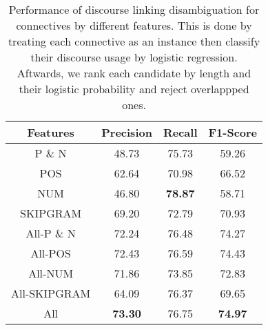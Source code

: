 \begin{table}[h]
\centering
\begin{tabular}{|c|c|c|c|}
\hline

\bf Features            & \bf Precision & \bf Recall & \bf F1-Score \\ \hline
    P \& N              &     48.73     &     75.73  &     59.26    \\ \hline
    POS                 &     62.64     &     70.98  &     66.52    \\ \hline
    NUM                 &     46.80     & \bf 78.87  &     58.71    \\ \hline
    SKIPGRAM            &     69.20     &     72.79  &     70.93    \\ \hline
    All-P \& N          &     72.24     &     76.48  &     74.27    \\ \hline
    All-POS             &     72.43     &     76.59  &     74.43    \\ \hline
    All-NUM             &     71.86     &     73.85  &     72.83    \\ \hline
    All-SKIPGRAM        &     64.09     &     76.37  &     69.65    \\ \hline
    All                 & \bf 73.30     &     76.75  & \bf 74.97    \\


\end{tabular}
\caption{\label{t:classify-features} Performance of discourse linking
disambiguation for connectives by different features. This is done by
treating each connective as an instance then classify their discourse usage
by logistic regression. Aftwards, we rank each candidate by length and their
logistic probability and reject overlappped ones.}
\end{table}

